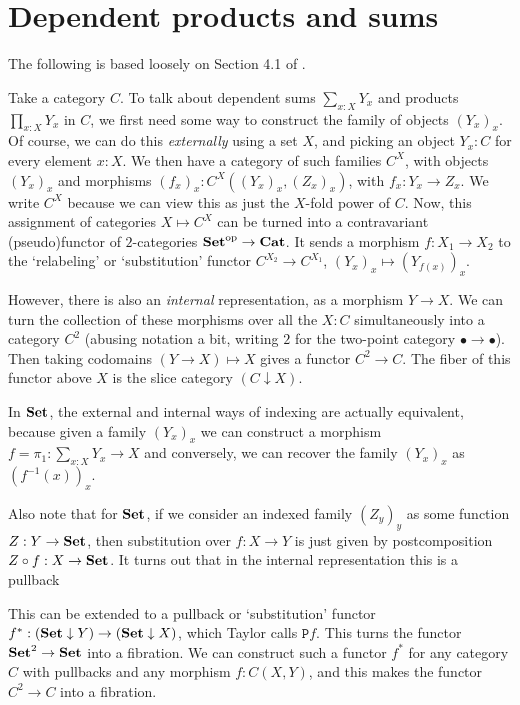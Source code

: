 \section{Dependent products and sums}\label{sec:dependent-products}
The following is based loosely on Section 4.1 of \autocite{taylor}.

Take a category $ C $. To talk about dependent sums $ \sum_{x: X} Y_x $ and products $ \prod_{x: X} Y_x $ in $ C $, we first need some way to construct the family of objects $ (Y_x)_x $. Of course, we can do this \textit{externally} using a set $ X $, and picking an object $ Y_x : C $ for every element $ x : X $. We then have a category of such families $ C^X $, with objects $ (Y_x)_x $ and morphisms $ (f_x)_x: C^X((Y_x)_x, (Z_x)_x) $, with $ f_x: Y_x \to Z_x $. We write $ C^X $ because we can view this as just the $ X $-fold power of $ C $. Now, this assignment of categories $ X \mapsto C^X $ can be turned into a contravariant (pseudo)functor of $ 2 $-categories $ \mathbf{Set}^{\text{op}} \to \mathbf{Cat} $. It sends a morphism $ f: X_1 \to X_2 $ to the `relabeling' or `substitution' functor $ C^{X_2} \to C^{X_1} $, $ (Y_x)_x \mapsto (Y_{f(x)})_x $.

However, there is also an \textit{internal} representation, as a morphism $ Y \to X $. We can turn the collection of these morphisms over all the $ X : C $ simultaneously into a category $ C^2 $ (abusing notation a bit, writing $ 2 $ for the two-point category $ \bullet \to \bullet $). Then taking codomains $ (Y \to X) \mapsto X $ gives a functor $ C^2 \to C $. The fiber of this functor above $ X $ is the slice category $ (C \downarrow X) $.

In $ \mathbf{Set} $, the external and internal ways of indexing are actually equivalent, because given a family $ (Y_x)_x $ we can construct a morphism $ f = \pi_1: \sum_{x : X} Y_x \to X $ and conversely, we can recover the family $ (Y_x)_x $ as $ (f^{-1}(x))_x $.

Also note that for $ \mathbf{Set} $, if we consider an indexed family $ (Z_y)_y $ as some function $ Z: Y \to \mathbf{Set} $, then substitution over $ f: X \to Y $ is just given by postcomposition $ Z \circ f: X \to \mathbf{Set} $. It turns out that in the internal representation this is a pullback
\begin{center}
\end{center}
This can be extended to a pullback or `substitution' functor $ f^* : (\mathbf{Set} \downarrow Y) \to (\mathbf{Set} \downarrow X) $, which Taylor calls $ \mathtt{P} f $. This turns the functor $ \mathbf{Set}^2 \to \mathbf{Set} $ into a fibration. We can construct such a functor $ f^* $ for any category $ C $ with pullbacks and any morphism $ f: C(X, Y) $, and this makes the functor $ C^2 \to C $ into a fibration.

